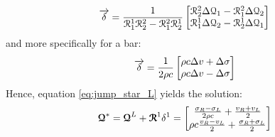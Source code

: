 \begin{equation}
  \label{eq:wave_strengths}
  {\overrightarrow{\delta}} = \frac{1}{\mathcal{R}^1_1\mathcal{R}^2_2 -\mathcal{R}_1^2\mathcal{R}^1_2}\left[\begin{matrix}\mathcal{R}^2_2\Delta \mathcal{Q}_1 - \mathcal{R}^2_1\Delta \mathcal{Q}_2 \\ \mathcal{R}^1_1\Delta \mathcal{Q}_2 - \mathcal{R}_2^1\Delta \mathcal{Q}_1\end{matrix}\right]
\end{equation}
and more specifically for a bar:
\begin{equation}
  \label{eq:wave_strengths_bar}
  {\overrightarrow{\delta}} = \frac{1}{2\rho c}\left[\begin{matrix}\rho c \Delta v + \Delta \sigma \\  \rho c \Delta v -\Delta \sigma \end{matrix}\right]
\end{equation}
Hence, equation \eqref{eq:jump_star_L} yields the solution:
\begin{equation}
  \label{eq:solution_charac_variables}
  {\boldsymbol{\mathcal{Q}}}^* = {\boldsymbol{\mathcal{Q}}}^L +{\boldsymbol{\mathcal{R}}}^1 \delta^1 = \left[\begin{matrix}\frac{\sigma_R - \sigma_L}{2\rho c} + \frac{v_R+v_L}{2} \\ \rho c\frac{v_R - v_L}{2} + \frac{\sigma_R+\sigma_L}{2}\end{matrix}\right] 
\end{equation}


